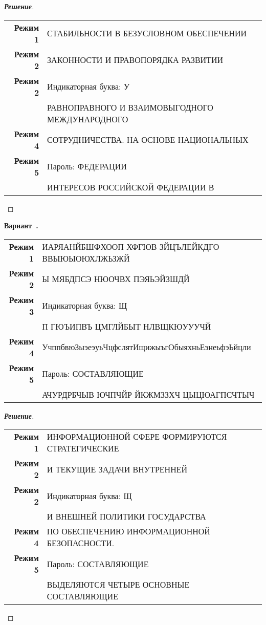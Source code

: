 \documentclass[a4paper,14pt]{extarticle}
\newcounter{exercise}[section]
\newenvironment{exercise}[1][]{\refstepcounter{exercise}\par\medskip
   \noindent\textbf{Вариант~\theexercise. #1}\\
   \noindent\makebox[\linewidth]{\rule{\textwidth}{1.25pt}}
   }
{\vspace{-2.5px}\mbox{}\newline \noindent\makebox[\linewidth]{\rule{\textwidth}{.5pt}}
}
\newenvironment{solution}
{\begin{proof}[\textbf{\textit{Решение}}]}
  {\end{proof}}
\begin{document}
\begin{solution}
\begin{table}[H]
	\centering
	\begin{tabular}{r l}\textbf{Режим 1}  & СТАБИЛЬНОСТИ В БЕЗУСЛОВНОМ ОБЕСПЕЧЕНИИ \\ 
\textbf{Режим 2}  & ЗАКОННОСТИ И ПРАВОПОРЯДКА РАЗВИТИИ \\ 
\textbf{Режим 2}  & Индикаторная буква: У \\ 
& РАВНОПРАВНОГО И ВЗАИМОВЫГОДНОГО МЕЖДУНАРОДНОГО \\ 
\textbf{Режим 4}  & СОТРУДНИЧЕСТВА. НА ОСНОВЕ НАЦИОНАЛЬНЫХ \\ 
\textbf{Режим 5}  & Пароль: ФЕДЕРАЦИИ \\ 
& ИНТЕРЕСОВ РОССИЙСКОЙ ФЕДЕРАЦИИ В \\ 
	\end{tabular} 
\end{table}

\end{solution}
\begin{exercise}\begin{table}[H]
	\centering
	\begin{tabular}{r l}\textbf{Режим 1}  & ИАРЯАНЙБШФХООП ХФГЮВ ЗЙЦЪЛЕЙКДГО ВВЫЮЫОЮХЛЖЬЗЖЙ \\ 
\textbf{Режим 2}  & Ы МЯБДПСЭ НЮОЧВХ ПЭЯЬЭЙЗШДЙ \\ 
\textbf{Режим 3}  & Индикаторная буква: Щ \\ 
& П ГЮЪИПВЪ ЦМГЛЙБЫТ НЛВЩКЮУУУЧЙ \\ 
\textbf{Режим 4}  & УчппбвюЗыэеэуьЧцфслятИщижыъгОбыяхньЕэнеьфэЬйцли \\ 
\textbf{Режим 5}  & Пароль: СОСТАВЛЯЮЩИЕ \\ 
& АЧУРДРБЧЫВ ЮЧПЧЙР ЙКЖМЗЗХЧ ЦЫЦЮАГПСЧТЫЧ \\ 
	\end{tabular} 
\end{table}

\end{exercise}
\begin{solution}
\begin{table}[H]
	\centering
	\begin{tabular}{r l}\textbf{Режим 1}  & ИНФОРМАЦИОННОЙ СФЕРЕ ФОРМИРУЮТСЯ СТРАТЕГИЧЕСКИЕ \\ 
\textbf{Режим 2}  & И ТЕКУЩИЕ ЗАДАЧИ ВНУТРЕННЕЙ \\ 
\textbf{Режим 2}  & Индикаторная буква: Щ \\ 
& И ВНЕШНЕЙ ПОЛИТИКИ ГОСУДАРСТВА \\ 
\textbf{Режим 4}  & ПО ОБЕСПЕЧЕНИЮ ИНФОРМАЦИОННОЙ БЕЗОПАСНОСТИ. \\ 
\textbf{Режим 5}  & Пароль: СОСТАВЛЯЮЩИЕ \\ 
& ВЫДЕЛЯЮТСЯ ЧЕТЫРЕ ОСНОВНЫЕ СОСТАВЛЯЮЩИЕ \\ 
	\end{tabular} 
\end{table}

\end{solution}
\end{document}
